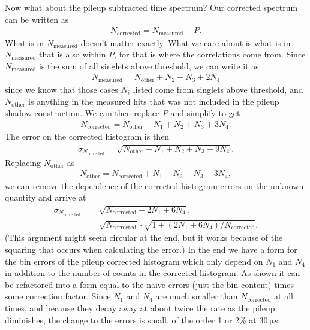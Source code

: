 Now what about the pileup subtracted time spectrum? Our corrected spectrum can be written as
 	\begin{align}
 		N_{\text{corrected}} = N_{\text{measured}} - P.
	\end{align}
What is in $N_{\text{measured}}$ doesn't matter exactly. What we care about is what is in $N_{\text{measured}}$ that is also within $P$, for that is where the correlations come from. Since $N_{\text{measured}}$ is the sum of all singlets above threshold, we can write it as
 	\begin{align}
 		N_{\text{measured}} = N_{\text{other}} + N_{2} + N_{3} + 2 N_{4}
	\end{align}
since we know that those cases $N_{i}$ listed come from singlets above threshold, and $N_{\text{other}}$ is anything in the measured hits that was not included in the pileup shadow construction. We can then replace $P$ and simplify to get
 	\begin{align}
 		N_{\text{corrected}} = N_{\text{other}} - N_{1} + N_{2} + N_{3} + 3 N_{4}.
	\end{align}
The error on the corrected histogram is then 
 	\begin{align}
 		\sigma_{N_{\text{corrected}}} = \sqrt{N_{\text{other}} + N_{1} + N_{2} + N_{3} + 9 N_{4}}.
	\end{align}
Replacing $N_{\text{other}}$ as
 	\begin{align}
 		N_{\text{other}} = N_{\text{corrected}} + N_{1} - N_{2} - N_{3} - 3 N_{4},
	\end{align}
we can remove the dependence of the corrected histogram errors on the unknown quantity and arrive at
	\begin{equation}	
	\begin{aligned}
 		\sigma_{N_{\text{corrected}}} &= \sqrt{N_{\text{corrected}} + 2 N_{1} + 6 N_{4}}, \\
 									  &= \sqrt{N_{\text{corrected}}} \cdot \sqrt{1 + (2 N_{1} + 6 N_{4})/N_{\text{corrected}}}.
 	\label{eq:pileupModErrors}
	\end{aligned}
	\end{equation}
(This argument might seem circular at the end, but it works because of the squaring that occurs when calculating the error.) In the end we have a form for the bin errors of the pileup corrected histogram which only depend on $N_{1}$ and $N_{4}$ in addition to the number of counts in the corrected histogram. As shown it can be refactored into a form equal to the naive errors (just the bin content) times some correction factor. Since $N_{1}$ and $N_{4}$ are much smaller than $N_{\text{corrected}}$ at all times, and because they decay away at about twice the rate as the pileup diminishes, the change to the errors is small, of the order 1 or 2\% at $\SI{30}{\micro s}$.




